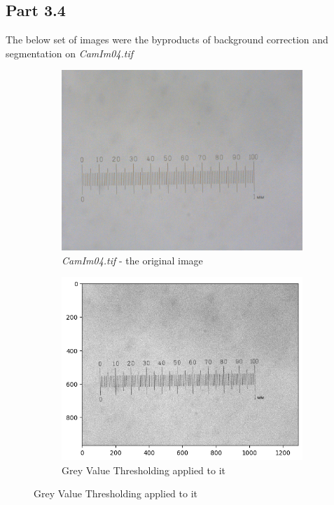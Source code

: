 \documentclass{article}
\begin{document}
\subsection*{Part 3.4}
The below set of images were the byproducts of background correction and segmentation on \emph{CamIm04.tif}

\begin{figure}[h!]
  \centering
  \begin{subfigure}{0.4\textwidth}
    \includegraphics[width=\linewidth]{Report/Appendix_Images/a4_original.png}
    \caption{\emph{CamIm04.tif} - the original image}
  \end{subfigure}
  \hfill
  \begin{subfigure}{0.4\textwidth}
    \includegraphics[width=\linewidth]{Report/Appendix_Images/a4_grey_image.png}
    \caption{Grey Value Thresholding applied to it}
  \end{subfigure}


\end{figure}
\end{document}
